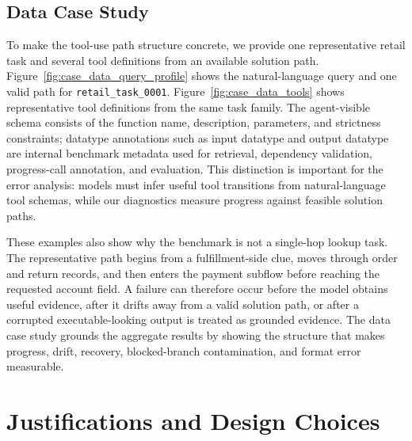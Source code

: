 \subsection{Data Case Study}
\label{app:data-case-study}

To make the tool-use path structure concrete, we provide one representative retail task and several tool definitions from an available solution path. Figure~\ref{fig:case_data_query_profile} shows the natural-language query and one valid path for \texttt{retail\_task\_0001}. Figure~\ref{fig:case_data_tools} shows representative tool definitions from the same task family. The agent-visible schema consists of the function name, description, parameters, and strictness constraints; datatype annotations such as input datatype and output datatype are internal benchmark metadata used for retrieval, dependency validation, progress-call annotation, and evaluation. This distinction is important for the error analysis: models must infer useful tool transitions from natural-language tool schemas, while our diagnostics measure progress against feasible solution paths.

These examples also show why the benchmark is not a single-hop lookup task. The representative path begins from a fulfillment-side clue, moves through order and return records, and then enters the payment subflow before reaching the requested account field. A failure can therefore occur before the model obtains useful evidence, after it drifts away from a valid solution path, or after a corrupted executable-looking output is treated as grounded evidence. The data case study grounds the aggregate results by showing the structure that makes progress, drift, recovery, blocked-branch contamination, and format error measurable.


\section{Justifications and Design Choices}
\label{app:justifications}

